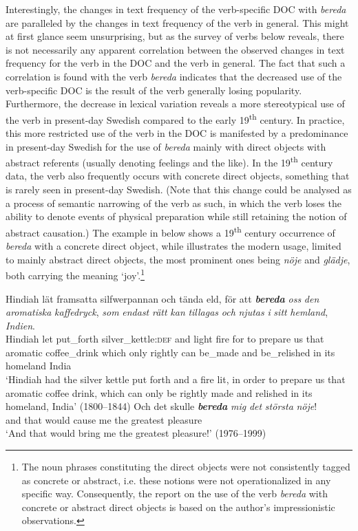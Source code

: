 \documentclass[output=paper]{langscibook}
\begin{document}
Interestingly, the changes in text frequency of the verb-specific DOC with \textit{bereda} are paralleled by the changes in text frequency of the verb in general. This might at first glance seem unsurprising, but as the survey of verbs below reveals, there is not necessarily any apparent correlation between the observed changes in text frequency for the verb in the DOC and the verb in general. The fact that such a correlation is found with the verb \textit{bereda} indicates that the decreased use of the verb-specific DOC is the result of the verb generally losing popularity. Furthermore, the decrease in lexical variation reveals a more stereotypical use of the verb in present-day Swedish compared to the early 19\textsuperscript{th} century. In practice, this more restricted use of the verb in the DOC is manifested by a predominance in present-day Swedish for the use of \textit{bereda} mainly with direct objects with abstract referents (usually denoting feelings and the like). In the 19\textsuperscript{th} century data, the verb also frequently occurs with concrete direct objects, something that is rarely seen in present-day Swedish. (Note that this change could be analysed as a process of semantic narrowing of the verb as such, in which the verb loses the ability to denote events of physical preparation while still retaining the notion of abstract causation.) The example in  below shows a 19\textsuperscript{th} century occurrence of \textit{bereda} with a concrete direct object, while  illustrates the modern usage, limited to mainly abstract direct objects, the most prominent ones being \textit{nöje} and \textit{glädje}, both carrying the meaning ‘joy’.\footnote{The noun phrases constituting the direct objects were not consistently tagged as concrete or abstract, i.e. these notions were not operationalized in any specific way. Consequently, the report on the use of the verb \textit{bereda} with concrete or abstract direct objects is based on the author’s impressionistic observations.}


\ea \label{ex:valdeson:8}
\gll Hindiah lät framsatta silfwerpannan   och tända eld, för att \textbf{\textit{bereda}} \textit{oss}  \textit{den} \textit{aromatiska}    \textit{kaffedryck},   \textit{som}  \textit{endast}  \textit{rätt}    \textit{kan}  \textit{tillagas} \textit{och}  \textit{njutas}      \textit{i}    \textit{sitt}  \textit{hemland},  \textit{Indien}. \\
   Hindiah let put\_forth  silver\_kettle:\textsc{def}     and light  fire for to prepare us    that  aromatic       coffee\_drink  which  only    rightly  can   be\_made and  be\_relished    in    its    homeland     India\\
\glt ‘Hindiah had the silver kettle put forth and a fire lit, in order to prepare us that aromatic coffee drink, which can only be rightly made and relished in its homeland, India’ (1800–1844)
\ex \label{ex:valdeson:9}
\gll Och  det    skulle \textbf{\textit{bereda}} \textit{mig}  \textit{det}  \textit{största}    \textit{nöje}!\\
  and      that      would  cause      me    the  greatest  pleasure\\
\glt `And that would bring me the greatest pleasure!’ (1976–1999)
\z
\end{document}
